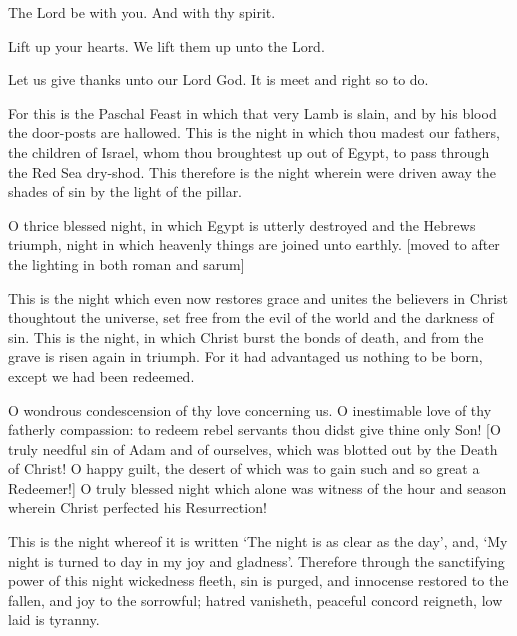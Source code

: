 \V The Lord be with you.  \R And with thy spirit.

\V Lift up your hearts.  \R We lift them up unto the Lord.

\V Let us give thanks unto our Lord God.  \R It is meet and right so to do.



For this is the Paschal Feast in which that very Lamb is slain, and by his blood the door-posts are hallowed.  This is the night in which thou madest our fathers, the children of Israel, whom thou broughtest up out of Egypt, to pass through the Red Sea dry-shod.  This therefore is the night wherein were driven away the shades of sin by the light of the pillar.

O thrice blessed night, in which Egypt is utterly destroyed and the Hebrews triumph, night in which heavenly things are joined unto earthly. [moved to after the lighting in both roman and sarum]

This is the night which even now restores grace and unites the believers in Christ thoughtout the universe, set free from the evil of the world and the darkness of sin. This is the night, in which Christ burst the bonds of death, and from the grave is risen again in triumph.  For it had advantaged us nothing to be born, except we had been redeemed.

O wondrous condescension of thy love concerning us. O inestimable love of thy fatherly compassion: to redeem rebel servants thou didst give thine only Son! [O truly needful sin of Adam and of ourselves, which was blotted out by the Death of Christ!  O happy guilt, the desert of which was to gain such and so great a Redeemer!] O truly blessed night which alone was witness of the hour and season wherein Christ perfected his Resurrection!

This is the night whereof it is written ‘The night is as clear as the day’, and, ‘My night is turned to day in my joy and gladness’.  Therefore through the sanctifying power of this night wickedness fleeth, sin is purged, and innocense restored to the fallen, and joy to the sorrowful; hatred vanisheth, peaceful concord reigneth, low laid is tyranny.


{\centering{}\par}


